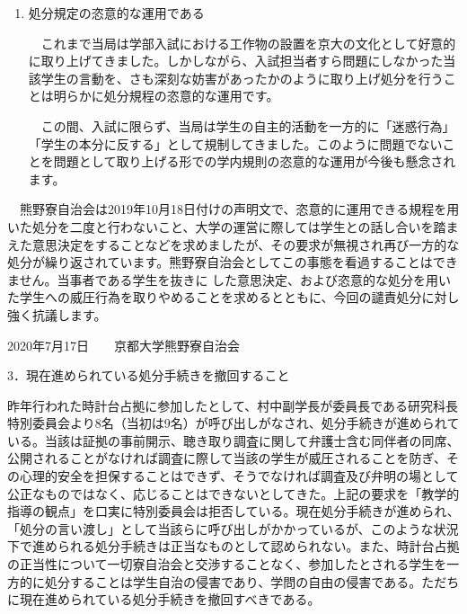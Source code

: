{\begin{tcolorbox}[colback=white, colbacktitle=gray!30!white, coltitle=black, title=2019年学部入試における「オルガ像」設置を理由とした学生処分についての抗議文,breakable]
\begin{enumerate}
        　この事実からも「オルガ像」の設置は入試業務の進行に対して何ら実害を与えていないものであることは明らかです。
        \item 処分規定の恣意的な運用である
    
        　これまで当局は学部入試における工作物の設置を京大の文化として好意的に取り上げてきました。しかしながら、入試担当者すら問題にしなかった当該学生の言動を、さも深刻な妨害があったかのように取り上げ処分を行うことは明らかに処分規程の恣意的な運用です。
    
        　この間、入試に限らず、当局は学生の自主的活動を一方的に「迷惑行為」「学生の本分に反する」として規制してきました。このように問題でないことを問題として取り上げる形での学内規則の恣意的な運用が今後も懸念されます。
    \end{enumerate}
    
    
    　熊野寮自治会は2019年10月18日付けの声明文で、恣意的に運用できる規程を用いた処分を二度と行わないこと、大学の運営に際しては学生との話し合いを踏まえた意思決定をすることなどを求めましたが、その要求が無視され再び一方的な処分が繰り返されています。熊野寮自治会としてこの事態を看過することはできません。当事者である学生を抜きに
    した意思決定、および恣意的な処分を用いた学生への威圧行為を取りやめることを求めるとともに、今回の譴責処分に対し強く抗議します。
    
    \begin{flushright}
    2020年7月17日　　京都大学熊野寮自治会
    \end{flushright}
    
\end{tcolorbox}

\begin{tcolorbox}[colback=white, colbacktitle=gray!30!white, coltitle=black, title=公開要求書（2021年11月26日）の要求3,breakable]
    3．現在進められている処分手続きを撤回すること
    
    昨年行われた時計台占拠に参加したとして、村中副学長が委員長である研究科長特別委員会より8名（当初は9名）が呼び出しがなされ、処分手続きが進められている。当該は証拠の事前開示、聴き取り調査に関して弁護士含む同伴者の同席、公開されることがなければ調査に際して当該の学生が威圧されることを防ぎ、その心理的安全を担保することはできず、そうでなければ調査及び弁明の場として公正なものではなく、応じることはできないとしてきた。上記の要求を「教学的指導の観点」を口実に特別委員会は拒否している。現在処分手続きが進められ、「処分の言い渡し」として当該らに呼び出しがかかっているが、このような状況下で進められる処分手続きは正当なものとして認められない。また、時計台占拠の正当性について一切寮自治会と交渉することなく、参加したとされる学生を一方的に処分することは学生自治の侵害であり、学問の自由の侵害である。ただちに現在進められている処分手続きを撤回すべきである。
\end{tcolorbox}

}